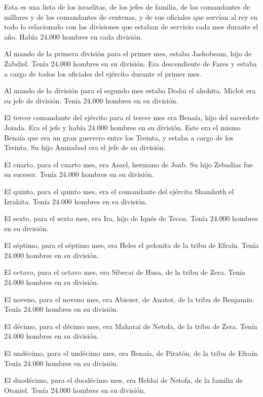  Esta es una lista de los israelitas, de los jefes de
familia, de los comandantes de millares y de los comandantes de
centenas, y de sus oficiales que servían al rey en todo lo relacionado
con las divisiones que estaban de servicio cada mes durante el año.
Había 24.000 hombres en cada división.

 Al mando de la primera división para el primer mes, estaba
Jashobeam, hijo de Zabdiel. Tenía 24.000 hombres en su división.
 Era descendiente de Fares y estaba a cargo de todos los
oficiales del ejército durante el primer mes.

 Al mando de la división para el segundo mes estaba Dodai el
ahohita. Miclot era su jefe de división. Tenía 24.000 hombres en su
división.

 El tercer comandante del ejército para el tercer mes era
Benaía, hijo del sacerdote Joiada. Era el jefe y había 24.000 hombres en
su división.  Este era el mismo Benaía que era un gran
guerrero entre los Treinta, y estaba a cargo de los Treinta. Su hijo
Amizabad era el jefe de su división.

 El cuarto, para el cuarto mes, era Asael, hermano de Joab.
Su hijo Zebadías fue su sucesor. Tenía 24.000 hombres en su división.

 El quinto, para el quinto mes, era el comandante del
ejército Shamhuth el Izrahita. Tenía 24.000 hombres en su división.

 El sexto, para el sexto mes, era Ira, hijo de Iqués de
Tecoa. Tenía 24.000 hombres en su división.

 El séptimo, para el séptimo mes, era Heles el pelonita de
la tribu de Efraín. Tenía 24.000 hombres en su división.

 El octavo, para el octavo mes, era Sibecai de Husa, de la
tribu de Zera. Tenía 24.000 hombres en su división.

 El noveno, para el noveno mes, era Abiezer, de Anatot, de
la tribu de Benjamín. Tenía 24.000 hombres en su división.

 El décimo, para el décimo mes, era Maharai de Netofa, de
la tribu de Zera. Tenía 24.000 hombres en su división.

 El undécimo, para el undécimo mes, era Benaía, de Piratón,
de la tribu de Efraín. Tenía 24.000 hombres en su división.

 El duodécimo, para el duodécimo mes, era Heldai de Netofa,
de la familia de Otoniel. Tenía 24.000 hombres en su división.

